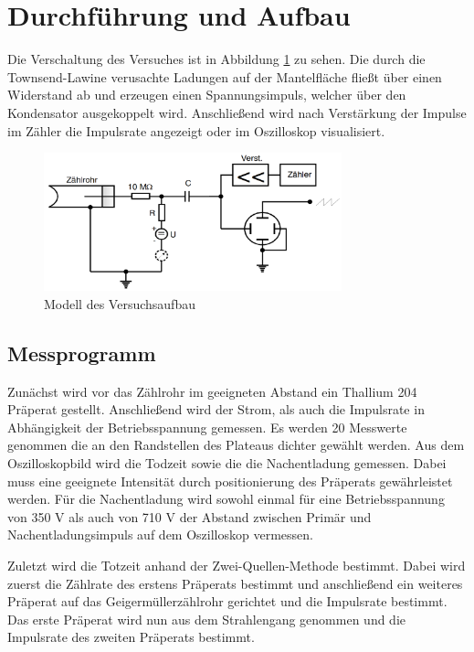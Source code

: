 \section{Durchführung und Aufbau}
\label{sec:Durchführung}
Die Verschaltung des Versuches ist in Abbildung \ref{fig:Aufbau} zu sehen. Die durch die Townsend-Lawine verusachte Ladungen auf der Mantelfläche fließt über einen Widerstand ab und erzeugen einen Spannungsimpuls, welcher über den Kondensator ausgekoppelt wird. Anschließend wird nach Verstärkung der Impulse im Zähler die Impulsrate angezeigt oder im Oszilloskop visualisiert.
\begin{figure}
  \centering
  \includegraphics[height=4cm]{picture/Aufbau.pdf}
  \caption{Modell des Versuchsaufbau}
  \label{fig:Aufbau}
\end{figure}
\subsection{Messprogramm}
Zunächst wird vor das Zählrohr im geeigneten Abstand ein Thallium 204 Präperat gestellt. Anschließend wird der Strom, als auch die Impulsrate in Abhängigkeit der Betriebsspannung gemessen. Es werden 20 Messwerte genommen die an den Randstellen des Plateaus dichter gewählt werden. 
Aus dem Oszilloskopbild wird die Todzeit sowie die die Nachentladung gemessen. Dabei muss eine geeignete Intensität durch positionierung des Präperats gewährleistet werden. Für die Nachentladung wird sowohl einmal für eine Betriebsspannung von 350 V als auch von 710 V der Abstand zwischen Primär und Nachentladungsimpuls auf dem Oszilloskop vermessen. 

Zuletzt wird die Totzeit anhand der Zwei-Quellen-Methode bestimmt. Dabei wird zuerst die Zählrate des erstens Präperats bestimmt und anschließend ein weiteres Präperat auf das Geigermüllerzählrohr gerichtet und die Impulsrate bestimmt. Das erste Präperat wird nun aus dem Strahlengang genommen und die Impulsrate des zweiten Präperats bestimmt. 
